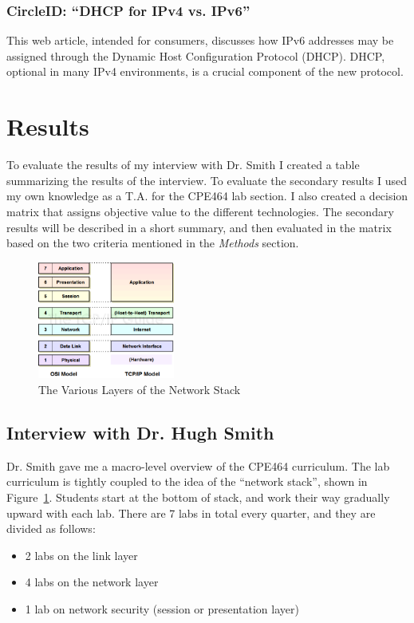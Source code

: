 \documentclass[12pt]{article}
\begin{document}
\subsubsection{CircleID: ``DHCP for IPv4 vs. IPv6''}
This web article, intended for consumers, discusses how IPv6 addresses may be assigned through the Dynamic Host Configuration Protocol (DHCP). DHCP, optional in many IPv4 environments, is a crucial component of the new protocol.

\section{Results}
To evaluate the results of my interview with Dr. Smith I created a table summarizing the results of the interview. To evaluate the secondary results I used my own knowledge as a T.A. for the CPE464 lab section. I also created a decision matrix that assigns objective value to the different technologies. The secondary results will be described in a short summary, and then evaluated in the matrix based on the two criteria mentioned in the \textit{Methods} section.

\begin{figure}[ht!]
  \centering
  \includegraphics[width=0.4\textwidth]{the_stack.png}
  \caption{The Various Layers of the Network Stack}
  \label{fig:the_stack}
\end{figure}

\subsection{Interview with Dr. Hugh Smith}
Dr. Smith gave me a macro-level overview of the CPE464 curriculum. The lab curriculum is tightly coupled to the idea of the ``network stack'', shown in Figure~\ref{fig:the_stack}. Students start at the bottom of stack, and work their way gradually upward with each lab. There are 7 labs in total every quarter, and they are divided as follows:
\begin{itemize}
\item 2 labs on the link layer
\item 4 labs on the network layer
\item 1 lab on network security (session or presentation layer)
\end{itemize}
\end{document}
